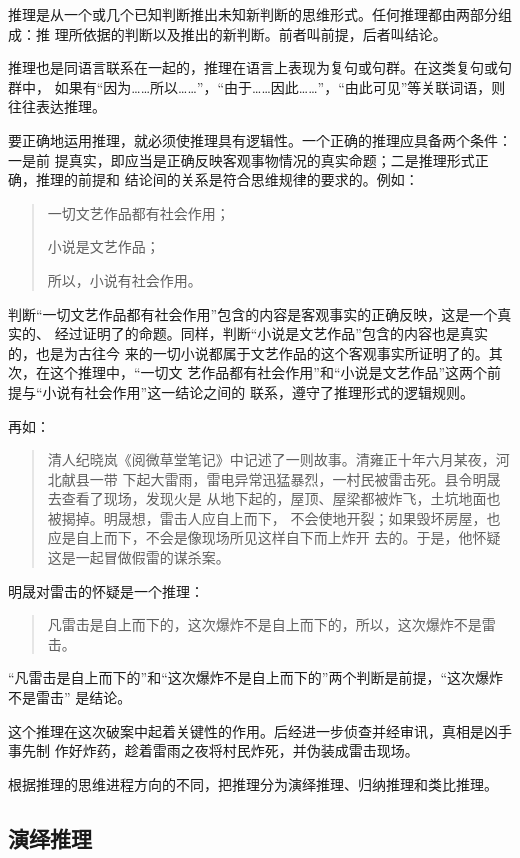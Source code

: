 \documentclass[final,oneside]{ctexbook}
\newenvironment{equotation}{\begin{quotation}\kaishu}{\end{quotation}}
\begin{document}
推理是从一个或几个已知判断推出未知新判断的思维形式。任何推理都由两部分组成：推
理所依据的判断以及推出的新判断。前者叫前提，后者叫结论。

推理也是同语言联系在一起的，推理在语言上表现为复句或句群。在这类复句或句群中，
如果有“因为……所以……”，“由于……因此……”，“由此可见”等关联词语，则往往表达推理。

要正确地运用推理，就必须使推理具有逻辑性。一个正确的推理应具备两个条件：一是前
提真实，即应当是正确反映客观事物情况的真实命题；二是推理形式正确，推理的前提和
结论间的关系是符合思维规律的要求的。例如：
\begin{equotation}
  一切文艺作品都有社会作用；

  小说是文艺作品；

  所以，小说有社会作用。
\end{equotation}
判断“一切文艺作品都有社会作用”包含的内容是客观事实的正确反映，这是一个真实的、
经过证明了的命题。同样，判断“小说是文艺作品”包含的内容也是真实的，也是为古往今
来的一切小说都属于文艺作品的这个客观事实所证明了的。其次，在这个推理中，“一切文
艺作品都有社会作用”和“小说是文艺作品”这两个前提与“小说有社会作用”这一结论之间的
联系，遵守了推理形式的逻辑规则。

再如：
\begin{equotation}
  清人纪晓岚《阅微草堂笔记》中记述了一则故事。清雍正十年六月某夜，河北献县一带
  下起大雷雨，雷电异常迅猛暴烈，一村民被雷击死。县令明晟去查看了现场，发现火是
  从地下起的，屋顶、屋梁都被炸飞，土坑地面也被揭掉。明晟想，雷击人应自上而下，
  不会使地开裂；如果毁坏房屋，也应是自上而下，不会是像现场所见这样自下而上炸开
  去的。于是，他怀疑这是一起冒做假雷的谋杀案。
\end{equotation}
明晟对雷击的怀疑是一个推理：
\begin{equotation}
  凡雷击是自上而下的，这次爆炸不是自上而下的，所以，这次爆炸不是雷击。
\end{equotation}
“凡雷击是自上而下的”和“这次爆炸不是自上而下的”两个判断是前提，“这次爆炸不是雷击”
是结论。

这个推理在这次破案中起着关键性的作用。后经进一步侦查并经审讯，真相是凶手事先制
作好炸药，趁着雷雨之夜将村民炸死，并伪装成雷击现场。

根据推理的思维进程方向的不同，把推理分为演绎推理、归纳推理和类比推理。

\subsection{演绎推理}

\end{document}
